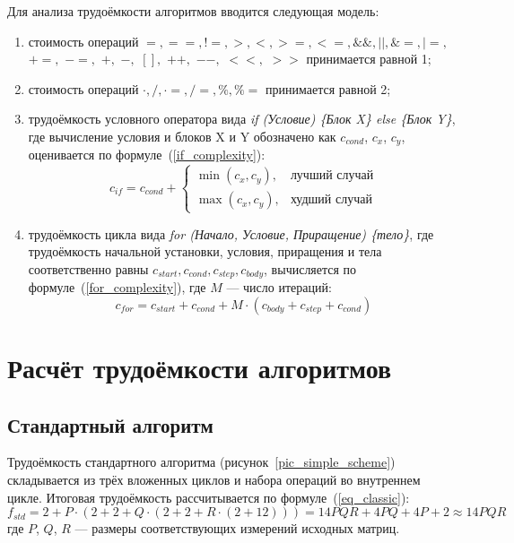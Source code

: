 Для анализа трудоёмкости алгоритмов вводится следующая модель:
\begin{enumerate}
	\item стоимость операций $=, ==, !=, >, <, >=, <=, \&\&, ||, \&=, |=,$ $+=,$ $-=,$ $+,$ $-,$ $[],$ $ ++,$ $--,$ $<<,$ $>>$ принимается равной 1;
	\item стоимость операций $\cdot, /, \cdot=, /=, \%, \%=$ принимается равной 2;
	\item трудоёмкость условного оператора вида \textit{if (Условие) \{Блок X\} else \{Блок Y\}}, где вычисление условия и блоков X и Y обозначено как $c_{cond}$, $c_x$, $c_y$, оценивается по формуле~(\ref{if_complexity}):
	\begin{equation}
		\label{if_complexity}
		c_{if} = c_{cond} + 
		\begin{cases}
			\min(c_x, c_y), & \text{лучший случай} \\
			\max(c_x, c_y), & \text{худший случай}
		\end{cases}
	\end{equation}
	\item трудоёмкость цикла вида \textit{for (Начало, Условие, Приращение) \{тело\}}, где трудоёмкость начальной установки, условия, приращения и тела соответственно равны $c_{start}, c_{cond}, c_{step}, c_{body}$, вычисляется по формуле~(\ref{for_complexity}), где $M$ --- число итераций:
	\begin{equation}
		\label{for_complexity}
		c_{for} = c_{start} + c_{cond} + M \cdot (c_{body} + c_{step} + c_{cond})
	\end{equation}
\end{enumerate}

\section{Расчёт трудоёмкости алгоритмов}

\subsection{Стандартный алгоритм}

Трудоёмкость стандартного алгоритма (рисунок~\ref{pic_simple_scheme}) складывается из трёх вложенных циклов и набора операций во внутреннем цикле. Итоговая трудоёмкость рассчитывается по формуле~(\ref{eq_classic}):
\begin{equation}
	\label{eq_classic}
	f_{std} = 2 + P \cdot (2 + 2 + Q \cdot (2 + 2 + R \cdot (2 + 12))) = 14 P Q R + 4 P Q + 4 P + 2 \approx 14 P Q R
\end{equation}
где $P$, $Q$, $R$ — размеры соответствующих измерений исходных матриц.

